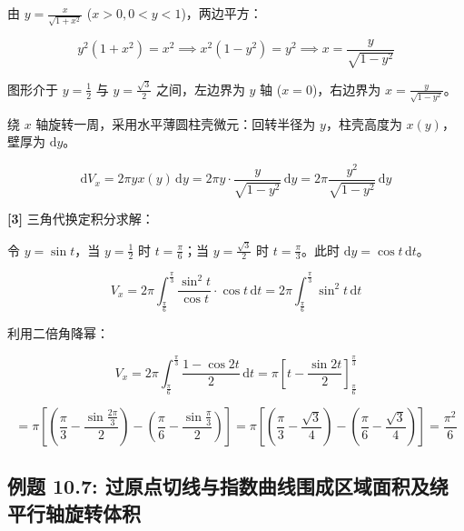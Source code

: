 \documentclass[11pt,a4paper,UTF8]{ctexart}
\begin{document}
\begin{solbox}[分步推导与答题规范]
由 $y = \frac{x}{\sqrt{1+x^2}}$ ($x > 0, 0 < y < 1$)，两边平方：


\begin{equation*}
y^2(1+x^2) = x^2 \implies x^2(1-y^2) = y^2 \implies x = \frac{y}{\sqrt{1-y^2}}
\end{equation*}


图形介于 $y = \frac{1}{2}$ 与 $y = \frac{\sqrt{3}}{2}$ 之间，左边界为 $y$ 轴 ($x=0$)，右边界为 $x = \frac{y}{\sqrt{1-y^2}}$。

绕 $x$ 轴旋转一周，采用水平薄圆柱壳微元：回转半径为 $y$，柱壳高度为 $x(y)$，壁厚为 $\mathrm{d}y$。


\begin{equation*}
\mathrm{d}V_x = 2\pi y x(y)\,\mathrm{d}y = 2\pi y \cdot \frac{y}{\sqrt{1-y^2}}\,\mathrm{d}y = 2\pi \frac{y^2}{\sqrt{1-y^2}}\,\mathrm{d}y
\end{equation*}


\textbf{[3]} 三角代换定积分求解：

令 $y = \sin t$，当 $y = \frac{1}{2}$ 时 $t = \frac{\pi}{6}$；当 $y = \frac{\sqrt{3}}{2}$ 时 $t = \frac{\pi}{3}$。此时 $\mathrm{d}y = \cos t\,\mathrm{d}t$。


\begin{equation*}
V_x = 2\pi \int_{\frac{\pi}{6}}^{\frac{\pi}{3}} \frac{\sin^2 t}{\cos t} \cdot \cos t\,\mathrm{d}t = 2\pi \int_{\frac{\pi}{6}}^{\frac{\pi}{3}} \sin^2 t\,\mathrm{d}t
\end{equation*}


利用二倍角降幂：


\begin{equation*}
V_x = 2\pi \int_{\frac{\pi}{6}}^{\frac{\pi}{3}} \frac{1 - \cos 2t}{2}\,\mathrm{d}t = \pi \left[t - \frac{\sin 2t}{2}\right]_{\frac{\pi}{6}}^{\frac{\pi}{3}}
\end{equation*}



\begin{equation*}
= \pi \left[\left(\frac{\pi}{3} - \frac{\sin\frac{2\pi}{3}}{2}\right) - \left(\frac{\pi}{6} - \frac{\sin\frac{\pi}{3}}{2}\right)\right] = \pi \left[\left(\frac{\pi}{3} - \frac{\sqrt{3}}{4}\right) - \left(\frac{\pi}{6} - \frac{\sqrt{3}}{4}\right)\right] = \frac{\pi^2}{6}
\end{equation*}

\end{solbox}


\subsection{例题 10.7: 过原点切线与指数曲线围成区域面积及绕平行轴旋转体积}
\end{document}
